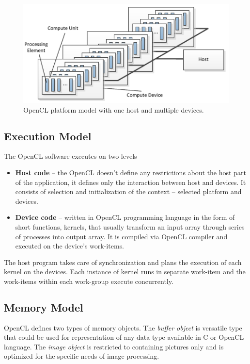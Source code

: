 \begin{figure}[H]
\centering
\includegraphics[width=14cm]{fig/platform_model.pdf}
\caption[OpenCL platform model]{OpenCL platform model with one host and multiple
devices\cite{opencl}.}
\label{oclpm}
\end{figure}


\subsection{Execution Model}
The OpenCL software executes on two levels
\begin{itemize}
\item \textbf{Host code} -- the OpenCL doesn't define any restrictions about the 
host part of the application, it defines only the interaction between host and 
devices. It consists of selection and initialization of the context -- selected 
platform and devices.
\item \textbf{Device code} -- written in OpenCL programming language in the form
of short functions, kernels, that usually transform an input array through 
series of processes into output array. It is compiled via OpenCL compiler and 
executed on the device's work-items.
\end{itemize}

The host program takes care of synchronization and plans the execution of each
kernel on the devices. Each instance of kernel runs in separate work-item and 
the work-items within each work-group execute concurrently. 

\subsection{Memory Model}
OpenCL defines two types of memory objects. The \textit{buffer object} is
versatile type that could be used for representation of any data type 
available in C or OpenCL language. The \textit{image object} is restricted 
to containing pictures only and is optimized for the specific needs of 
image processing.

